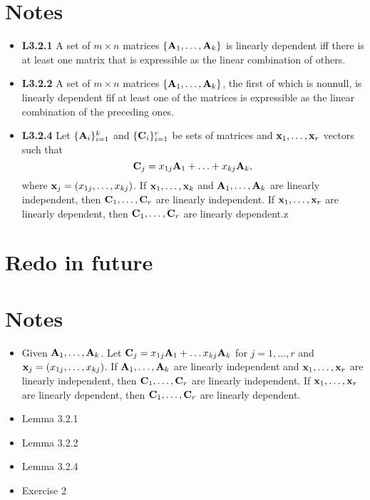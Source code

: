 \documentclass[a4paper, oneside]{book}
\begin{document}
\section{Notes}
\begin{itemize}
\item \textbf{L3.2.1} A set of $m\times n$ matrices  $\{\mathbf A_1, \hdots,  \mathbf A_k\}$  is linearly dependent iff there is at least one matrix that is expressible as the linear combination of others.
\item \textbf{L3.2.2} A set of $m\times n$ matrices  $\{\mathbf A_1, \hdots,  \mathbf A_k\}$, the first of which is nonnull, is linearly dependent fif at least one of the matrices is expressible as the linear combination of the preceding ones.
\item \textbf{L3.2.4} Let $\{\mathbf A_i\}_{i=1}^k$ and $\{\mathbf C_i\}_{i=1}^r$ be sets of matrices and $\mathbf x_1,\hdots,\mathbf x_r$ vectors such that $$\mathbf C_j = x_{1j} \mathbf A_1 + \hdots + x_{kj} \mathbf A_k,$$
where $\mathbf x_j = (x_{1j}, \hdots, x_{kj})$. If $\mathbf x_1, \hdots, \mathbf x_k$ and $\mathbf A_1, \hdots, \mathbf A_k$ are linearly independent, then $\mathbf C_1, \hdots, \mathbf C_r$ are linearly independent. If $\mathbf {x}_1, \hdots, \mathbf x_r$ are linearly dependent, then $\mathbf C_1, \hdots, \mathbf C_r$ are linearly dependent.z
\end{itemize}

\section{Redo in future}


\section*{Notes}
\begin{itemize}
\item Given $\mathbf{A}_1,\hdots,\mathbf{A}_k$. Let $\mathbf{C}_j=x_{1j}\mathbf{A}_1+\hdots x_{kj}\mathbf{A}_k$ for $j=1,\hdots,r$ and $\mathbf{x}_j=(x_{1j}, \hdots, x_{kj})$. If  $\mathbf{A}_1,\hdots,\mathbf{A}_k$ are linearly independent and $\mathbf{x}_1, \hdots, \mathbf{x}_r$ are linearly independent, then $\mathbf{C}_1,\hdots,\mathbf{C}_r$ are linearly independent. If $\mathbf{x}_1, \hdots, \mathbf{x}_r$ are linearly dependent, then $\mathbf{C}_1,\hdots,\mathbf{C}_r$ are linearly dependent.
\end{itemize}


\begin{itemize}
\item Lemma 3.2.1
\item Lemma 3.2.2
\item Lemma 3.2.4
\item Exercise 2
\end{itemize}
\end{document}
